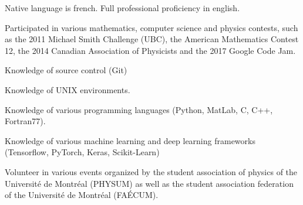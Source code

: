 \begin{cvletter}
{
  \begin{cvitems}
    \item {Native language is french. Full professional proficiency in english.}
    \item{Participated in various mathematics, computer science and physics contests, such as the 2011 Michael Smith Challenge (UBC), the American Mathematics Contest 12, the 2014 Canadian Association of Physicists and the 2017 Google Code Jam.}
    \item{Knowledge of source control (Git)}
    \item{Knowledge of UNIX environments.}
    \item{Knowledge of various programming languages (Python, MatLab, C, C++, Fortran77).}
    \item{Knowledge of various machine learning and deep learning frameworks (Tensorflow, PyTorch, Keras, Scikit-Learn)}
    \item{Volunteer in various events organized by the student association of physics of the Universit\'e de Montr\'eal (PHYSUM) as well as the student association federation of the Universit\'e de Montr\'eal (FA\'ECUM).}
  \end{cvitems}
 }
\end{cvletter}
